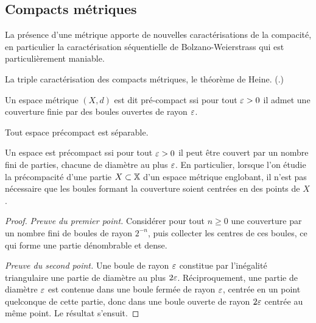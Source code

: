 \subsection{Compacts métriques}
\label{subsec:compactMetric}
La présence d'une métrique apporte de nouvelles caractérisations de la compacité, en particulier la caractérisation séquentielle de Bolzano-Weierstrass qui est particulièrement maniable. %

\begin{retenir}
La triple caractérisation des compacts métriques, le théorème de Heine.
(.)
\end{retenir}


\begin{definition}[Précompacité]
\label{def:precompact}
%
	Un espace métrique $(X,d)$ est dit pré-compact ssi pour tout $\varepsilon>0$ il admet une couverture finie par des boules ouvertes de rayon $\varepsilon$. 
\end{definition}


\begin{remark}
\label{rem:precompact_separable}
%
	Tout espace précompact est séparable. %
	
	Un espace est précompact ssi pour tout $\varepsilon>0$ il peut être couvert par un nombre fini de parties, chacune de diamètre au plus $\varepsilon$. En particulier, lorsque l'on étudie la précompacité d'une partie $X \subset \mathbb{X}$ d'un espace métrique englobant, il n'est pas nécessaire que les boules formant la couverture soient centrées en des points de $X$.
\end{remark}
\begin{proof}
	\emph{Preuve du premier point.} Considérer pour tout $n\geq 0$ une couverture par un nombre fini de boules de rayon $2^{-n}$, puis collecter les centres de ces boules, ce qui forme une partie dénombrable et dense.
	
	\emph{Preuve du second point.} Une boule de rayon $\varepsilon$ constitue par l'inégalité triangulaire une partie de diamètre au plus $2 \varepsilon$. Réciproquement, une partie de diamètre $\varepsilon$ est contenue dans une boule fermée de rayon $\varepsilon$, centrée en un point quelconque de cette partie, donc dans une boule ouverte de rayon $2 \varepsilon$ centrée au même point. Le résultat s'ensuit.
\end{proof}
 
